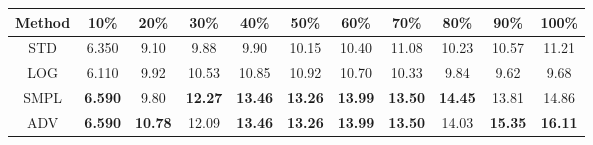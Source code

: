\documentclass{standalone}
\begin{document}
\begin{tabular}{c|cccccccccc}
      \toprule
      Method & 10\% & 20\% & 30\% & 40\% & 50\% & 60\% & 70\% & 80\% & 90\% & 100\% \\
      \midrule
STD & 6.350 & 9.10 & 9.88 & 9.90 & 10.15 & 10.40 & 11.08 & 10.23 & 10.57 & 11.21\\
LOG & 6.110 & 9.92 & 10.53 & 10.85 & 10.92 & 10.70 & 10.33 & 9.84 & 9.62 & 9.68\\
SMPL & \textbf{6.590} & 9.80 & \textbf{12.27} & \textbf{13.46} & \textbf{13.26} & \textbf{13.99} & \textbf{13.50} & \textbf{14.45} & 13.81 & 14.86\\
ADV & \textbf{6.590} & \textbf{10.78} & 12.09 & \textbf{13.46} & \textbf{13.26} & \textbf{13.99} & \textbf{13.50} & 14.03 & \textbf{15.35} & \textbf{16.11}\\
  \bottomrule
\end{tabular}
\end{document}
